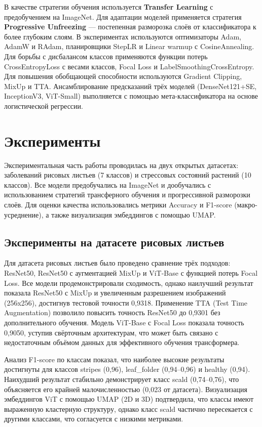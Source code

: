 \documentclass{misisarticle}
\begin{document}
В качестве стратегии обучения используется \textbf{Transfer Learning} с предобучением на ImageNet. Для адаптации моделей применяется стратегия \textbf{Progressive Unfreezing} — постепенная разморозка слоёв от классификатора к более глубоким слоям. В экспериментах используются оптимизаторы Adam, AdamW и RAdam, планировщики StepLR и Linear warmup с CosineAnnealing. Для борьбы с дисбалансом классов применяются функции потерь CrossEntropyLoss с весами классов, Focal Loss и LabelSmoothingCrossEntropy. Для повышения обобщающей способности используются Gradient Clipping, MixUp и TTA. Ансамблирование предсказаний трёх моделей (DenseNet121+SE, InceptionV3, ViT-Small) выполняется с помощью мета-классификатора на основе логистической регрессии.

\section{Эксперименты}
Экспериментальная часть работы проводилась на двух открытых датасетах: заболеваний рисовых листьев (7 классов) и стрессовых состояний растений (10 классов). Все модели предобучались на ImageNet и дообучались с использованием стратегий трансферного обучения и прогрессивной разморозки слоёв. Для оценки качества использовались метрики Accuracy и F1-score (макро-усреднение), а также визуализация эмбеддингов с помощью UMAP.

\subsection{Эксперименты на датасете рисовых листьев}
Для датасета рисовых листьев было проведено сравнение трёх подходов: ResNet50, ResNet50 с аугментацией MixUp и ViT-Base с функцией потерь Focal Loss. Все модели продемонстрировали сходимость, однако наилучший результат показала ResNet50 с MixUp и увеличенным разрешением изображений (256x256), достигнув тестовой точности 0,9318. Применение TTA (Test Time Augmentation) позволило повысить точность ResNet50 до 0,9301 без дополнительного обучения. Модель ViT-Base с Focal Loss показала точность 0,9050, уступив свёрточным архитектурам, что может быть связано с недостаточным объёмом данных для эффективного обучения трансформера.

Анализ F1-score по классам показал, что наиболее высокие результаты достигнуты для классов stripes (0,96), leaf\_folder (0,94–0,96) и healthy (0,94). Наихудший результат стабильно демонстрирует класс scald (0,74–0,76), что объясняется его крайней малочисленностью (0,023 от датасета). Визуализация эмбеддингов ViT с помощью UMAP (2D и 3D) подтвердила, что классы имеют выраженную кластерную структуру, однако класс scald частично пересекается с другими классами, что согласуется с низкими метриками.
\end{document}
